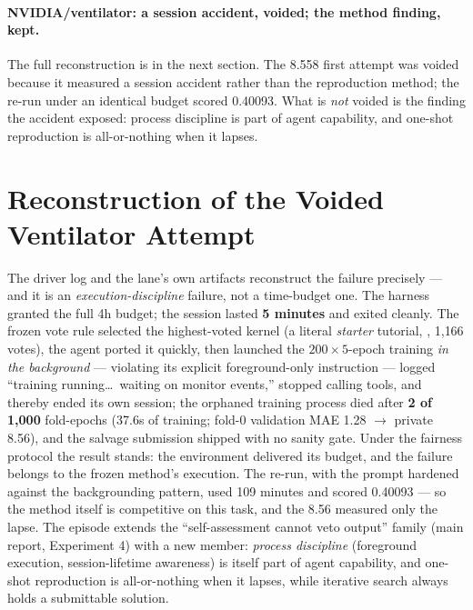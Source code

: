 \documentclass[11pt,a4paper]{article}
\begin{document}
\paragraph{NVIDIA/ventilator: a session accident, voided; the method finding, kept.} The full
reconstruction is in the next section. The 8.558 first attempt was voided because it measured
a session accident rather than the reproduction method; the re-run under an identical budget
scored 0.40093. What is \emph{not} voided is the finding the accident exposed: process
discipline is part of agent capability, and one-shot reproduction is all-or-nothing when it
lapses.

\section{Reconstruction of the Voided Ventilator Attempt}
\label{app:ventilator}

The driver log and the lane's own artifacts reconstruct the failure precisely --- and it is an \emph{execution-discipline} failure, not a time-budget one. The harness granted the full 4h budget; the session lasted \textbf{5 minutes} and exited cleanly. The frozen vote rule selected the highest-voted kernel (a literal \emph{starter} tutorial, , 1{,}166 votes), the agent ported it quickly, then launched the $200\times5$-epoch training \emph{in the background} --- violating its explicit foreground-only instruction --- logged ``training running\ldots\ waiting on monitor events,'' stopped calling tools, and thereby ended its own session; the orphaned training process died after \textbf{2 of 1{,}000} fold-epochs (37.6s of training; fold-0 validation MAE 1.28 $\to$ private 8.56), and the salvage submission shipped with no sanity gate. Under the fairness protocol the result stands: the environment delivered its budget, and the failure belongs to the frozen method's execution. The re-run, with the prompt hardened against the backgrounding pattern, used 109 minutes and scored 0.40093 --- so the method itself is competitive on this task, and the 8.56 measured only the lapse. The episode extends the ``self-assessment cannot veto output'' family (main report, Experiment 4) with a new member: \emph{process discipline} (foreground execution, session-lifetime awareness) is itself part of agent capability, and one-shot reproduction is all-or-nothing when it lapses, while iterative search always holds a submittable solution.
\end{document}

